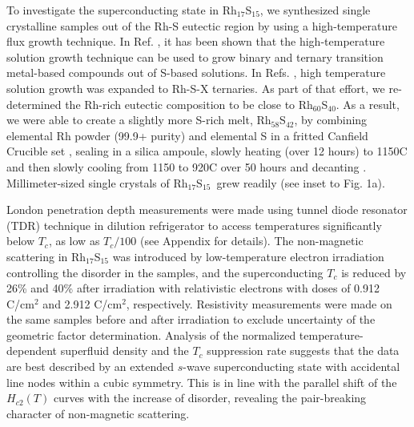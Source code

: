 \documentclass[aps,pra,reprint,superscriptaddress,floatfix]{revtex4-2}
\newcommand{\rhs}{Rh$_{17}$S$_{15}$}
\begin{document}
To investigate the superconducting state in \rhs, we synthesized single crystalline samples out of the Rh-S eutectic region by using a high-temperature flux growth technique. In Ref. \cite{Lin2012}, it has been shown that the high-temperature solution growth technique can be used to grow binary and ternary transition metal-based compounds out of S-based solutions. In Refs. \cite{Kaluarachchi2015,Kaluarachchi2016}, high temperature solution growth was expanded to Rh-S-X ternaries.  As part of that effort, we re-determined the Rh-rich eutectic composition to be close to Rh$_{60}$S$_{40}$.  As a result, we were able to create a slightly more S-rich melt, Rh$_{58}$S$_{42}$, by combining elemental Rh powder (99.9+ purity) and elemental S in a fritted Canfield Crucible set \cite{Canfield2016}, sealing in a silica ampoule, slowly heating (over 12 hours) to 1150\degree C and then slowly cooling from 1150 to 920\degree C over 50 hours and decanting \cite{Canfield2019}.   Millimeter-sized single crystals of \rhs~grew readily (see inset to Fig. 1a). 

London penetration depth measurements were made using tunnel diode resonator (TDR) technique \cite{Van-Degrift1975} in dilution refrigerator to access temperatures significantly below $T_c$, as low as $T_c/100$ \cite{kim2018} (see Appendix for details).
The non-magnetic scattering in Rh$_{17}$S$_{15}$ was introduced by low-temperature electron irradiation controlling the disorder in the samples, and the superconducting $T_c$ is reduced by 26\% and 40\% after irradiation with relativistic electrons with doses of 0.912 C/cm$^2$ and 2.912 C/cm$^2$, respectively. Resistivity measurements were made on the same samples before and after irradiation to exclude uncertainty of the geometric factor determination. 
Analysis of the normalized temperature-dependent superfluid density and the $T_c$ suppression rate suggests that the data are best described by an extended $s$-wave superconducting state with accidental line nodes within a cubic symmetry. 
This is in line with the parallel shift of the $H_{c2}(T)$ curves with the increase of disorder, revealing the pair-breaking character of non-magnetic scattering.

\end{document}
